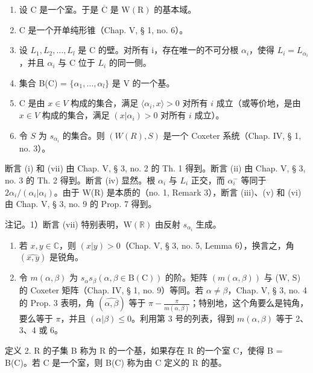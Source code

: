 \begin{enumerate}
\def\labelenumi{(\roman{enumi})}
\setcounter{enumi}{1}
\item
  设 \(\mathrm{C}\) 是一个室。于是 \(\overline{\mathrm{C}}\) 是 \(\mathrm{W}(\mathrm{R})\) 的基本域。
\item
  C 是一个开单纯形锥（Chap. V, § 1, no. 6）。
\item
  设 \(L_{1}, L_{2}, \ldots, L_{l}\) 是 C 的壁。对所有 i，存在唯一的不可分根 \(\alpha_{i}\)，使得 \(L_{i} = L_{\alpha_{i}}\)，并且 \(\alpha_{i}\) 与 C 位于 \(L_{i}\) 的同一侧。
\item
  集合 B(C) = \(\{\alpha_{1},\ldots,\alpha_{l}\}\) 是 V 的一个基。
\item
  C 是由 \(x \in V\) 构成的集合，满足 \(\langle \alpha_i, x \rangle > 0\) 对所有 \(i\) 成立（或等价地，是由 \(x \in V\) 构成的集合，满足 \((x|\alpha_i) > 0\) 对所有 \(i\) 成立）。
\item
  令 \(S\) 为 \(s_{\alpha_i}\) 的集合。则 \((W(R), S)\) 是一个 Coxeter 系统（Chap. IV, § 1, no. 3）。
\end{enumerate}

断言 (i) 和 (vii) 由 Chap. V, § 3, no. 2 的 Th. 1 得到。断言 (ii) 由 Chap. V, § 3, no. 3 的 Th. 2 得到。断言 (iv) 显然。根 \(\alpha_{i}\) 与 \(L_{i}\) 正交，而 \(\alpha_{i}^{-}\) 等同于 \(2\alpha_{i}/(\alpha_{i}|\alpha_{i})\)。由于 W(R) 是本质的（no. 1, Remark 3），断言 (iii)、(v) 和 (vi) 由 Chap. V, § 3, no. 9 的 Prop. 7 得到。

注记。1）断言 (vii) 特别表明，\(\mathrm{W}(\mathbb{R})\) 由反射 \(s_{\alpha_i}\) 生成。

\begin{enumerate}
\def\labelenumi{\arabic{enumi})}
\setcounter{enumi}{1}
\item
  若 \(x, y \in \mathbb{C}\)，则 \((x|y) > 0\)（Chap. V, § 3, no. 5, Lemma 6），换言之，角 \((\widehat{x,y})\) 是锐角。
\item
  令 \(m(\alpha, \beta)\) 为 \(s_{\alpha} s_{\beta} (\alpha, \beta \in \mathrm{B}(\mathrm{C}))\) 的阶。矩阵 \((m(\alpha, \beta))\) 与 (W, S) 的 Coxeter 矩阵（Chap. IV, § 1, no. 9）等同。若 \(\alpha \neq \beta\)，Chap. V, § 3, no. 4 的 Prop. 3 表明，角 \((\widehat{\alpha, \beta})\) 等于 \(\pi - \frac{\pi}{m(\alpha, \beta)}\)；特别地，这个角要么是钝角，要么等于 \(\pi\)，并且 \((\alpha | \beta) \leqslant 0\)。利用第 3 号的列表，得到 \(m(\alpha, \beta)\) 等于 2、3、4 或 6。
\end{enumerate}

定义 2. R 的子集 B 称为 R 的一个基，如果存在 R 的一个室 C，使得 B = B(C)。若 C 是一个室，则 B(C) 称为由 C 定义的 R 的基。

